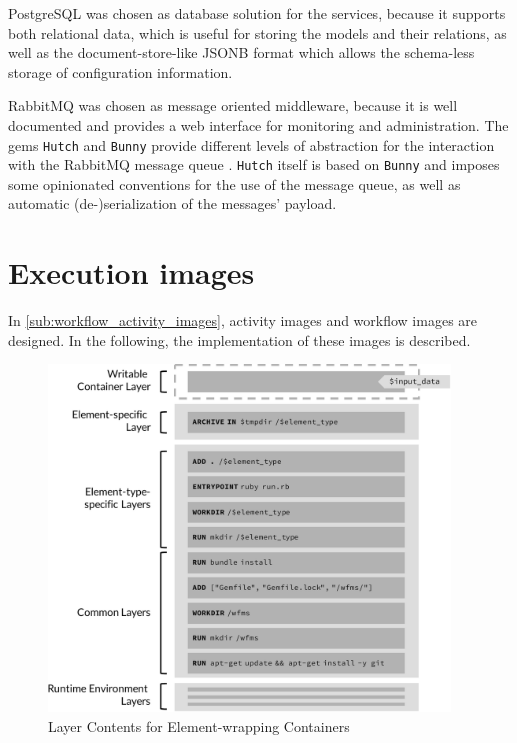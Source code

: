   PostgreSQL was chosen as database solution for the services, because it supports both relational data, which is useful for storing the models and their relations, as well as the document-store-like JSONB format which allows the schema-less storage of configuration information.

  RabbitMQ was chosen as message oriented middleware, because it is well documented and provides a web interface for monitoring and administration.
  The gems \texttt{Hutch} and \texttt{Bunny} provide different levels of abstraction for the interaction with the RabbitMQ message queue \cite{Software2016Rabbitmq}. \texttt{Hutch} itself is based on \texttt{Bunny} and imposes some opinionated conventions for the use of the message queue, as well as automatic (de-)serialization of the messages' payload.

\section{Execution images} %
\label{sec:execution_images}
  In \ref{sub:workflow_activity_images}, activity images and workflow images are designed. In the following, the implementation of these images is described.

  \begin{figure}[htbp]
    \centering
    \includegraphics[width=0.95\textwidth]{content/images/execution_container-crop.pdf}
    \caption{Layer Contents for Element-wrapping Containers}
    \label{fig:detailed_layers_for_element_wrapping_containers}
  \end{figure}

